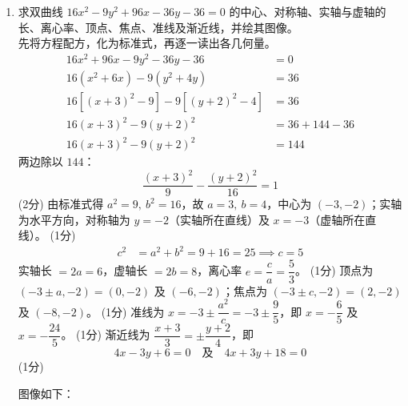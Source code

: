 \documentclass[12pt,a4paper]{exam-zh}
\newcommand{\solutionlayout}{%
    \setlength{\abovedisplayskip}{0.6em}%
    \setlength{\belowdisplayskip}{0.6em}%
    \setlength{\abovedisplayshortskip}{0.35em}%
    \setlength{\belowdisplayshortskip}{0.35em}%
    \setlength{\jot}{0.35em}%
}
\begin{document}
\begin{solution}
    \solutionlayout
    \begin{enumerate}[label=(\alph*),leftmargin=2.4em,itemsep=1em,topsep=0.5em,parsep=0.25em]
        \item 求双曲线 $16x^2-9y^2+96x-36y-36=0$ 的中心、对称轴、实轴与虚轴的长、离心率、顶点、焦点、准线及渐近线，并绘其图像。 \\
        先将方程配方，化为标准式，再逐一读出各几何量。
        \begin{align*}
            16x^2+96x-9y^2-36y-36 &= 0 \\
            16(x^2+6x)-9(y^2+4y) &= 36 \\
            16\left[(x+3)^2-9\right]-9\left[(y+2)^2-4\right] &= 36 \\
            16(x+3)^2-9(y+2)^2 &= 36+144-36 \\
            16(x+3)^2-9(y+2)^2 &= 144
        \end{align*}
        两边除以 $144$：
        \[
            \frac{(x+3)^2}{9}-\frac{(y+2)^2}{16}=1
        \]
        \hfill (2分)
        由标准式得 $a^2=9,\ b^2=16$，故 $a=3,\ b=4$，中心为 $(-3,-2)$；实轴为水平方向，对称轴为 $y=-2$（实轴所在直线）及 $x=-3$（虚轴所在直线）。
        \hfill (1分)
        \begin{align*}
            c^2 &= a^2+b^2 = 9+16=25 \implies c=5
        \end{align*}
        实轴长 $=2a=6$，虚轴长 $=2b=8$，离心率 $e=\dfrac{c}{a}=\dfrac{5}{3}$。
        \hfill (1分)
        顶点为 $(-3\pm a,-2)=(0,-2)$ 及 $(-6,-2)$；焦点为 $(-3\pm c,-2)=(2,-2)$ 及 $(-8,-2)$。
        \hfill (1分)
        准线为 $x=-3\pm\dfrac{a^2}{c}=-3\pm\dfrac{9}{5}$，即 $x=-\dfrac{6}{5}$ 及 $x=-\dfrac{24}{5}$。
        \hfill (1分)
        渐近线为 $\dfrac{x+3}{3}=\pm\dfrac{y+2}{4}$，即
        \[
            4x-3y+6=0 \quad \text{及} \quad 4x+3y+18=0
        \]
        \hfill (1分)

        图像如下：
        \begin{center}
\end{center}
\end{enumerate}
\end{solution}
\end{document}
